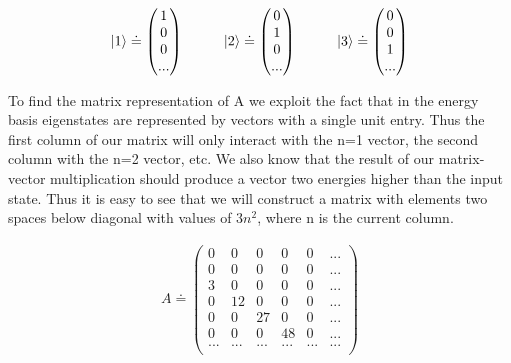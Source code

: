 \documentclass[10pt]{article} %
\begin{document}
\begin{align*}
  \ket{1} \doteq
  \begin{pmatrix}
    1\\
    0\\
    0\\
    ...\\
  \end{pmatrix}
  \hspace{1cm}
  \ket{2} \doteq
  \begin{pmatrix}
    0\\
    1\\
    0\\
    ...\\
  \end{pmatrix}
  \hspace{1cm}
  \ket{3} \doteq
  \begin{pmatrix}
    0\\
    0\\
    1\\
    ...\\
  \end{pmatrix}
\end{align*}

To find the matrix representation of A we exploit the fact that in the energy basis eigenstates
are represented by vectors with a single unit entry. Thus the first column of our matrix will only
interact with the n=1 vector, the second column with the n=2 vector, etc. We also know that the
result of our matrix-vector multiplication should produce a vector two energies higher than the
input state. Thus it is easy to see that we will construct a matrix with elements two spaces below
diagonal with values of $3n^2$, where n is the current column.

\begin{align*}
  A \doteq
  \begin{pmatrix}
    0 & 0 & 0 & 0 & 0 & ...  \\
    0 & 0 & 0 & 0 & 0 & ...  \\
    3 & 0 & 0 & 0 & 0 & ...  \\
    0 & 12 & 0 & 0 & 0 & ... \\
    0 & 0 & 27 & 0 & 0 & ... \\
    0 & 0 & 0 & 48 & 0 & ... \\
    ... & ... & ... & ... & ... & ... \\
  \end{pmatrix}
\end{align*}
\end{document}

